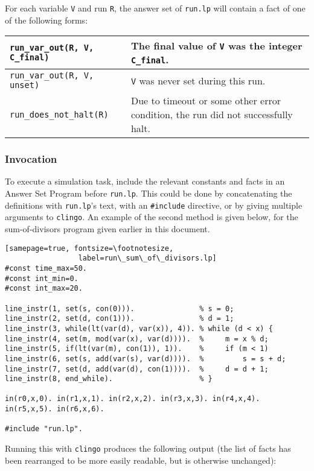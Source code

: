 \documentclass[a4paper,twoside,notitlepage,12pt]{article}
\begin{document}
For each variable \verb|V| and run \verb|R|, the answer set of \verb|run.lp| will 
contain a fact of one of the following forms:

\begin{tabularx}{\textwidth}{|l|X|}
\hline
\verb|run_var_out(R, V, C_final)| &
The final value of \verb|V| was the integer \verb|C_final|. \\*
\hline
\verb|run_var_out(R, V, unset)| &
\verb|V| was never set during this run. \\*
\hline
\verb|run_does_not_halt(R)| &
Due to timeout or some other error condition, the run did not successfully halt. \\*
\hline
\end{tabularx}

\subsubsection{Invocation} \label{sec:sim:inv}

To execute a simulation task, include the relevant constants and facts in an Answer Set 
Program before \verb|run.lp|. This could be done by concatenating the definitions with 
\verb|run.lp|'s text, with an \verb|#include| directive, or by giving multiple 
arguments to \verb|clingo|. An example of the second method is given below, for the 
sum-of-divisors program given earlier in this document.

\clearpage
\begin{verbatim}[samepage=true, fontsize=\footnotesize,
                 label=run\_sum\_of\_divisors.lp]
#const time_max=50.
#const int_min=0.
#const int_max=20.

line_instr(1, set(s, con(0))).               % s = 0;
line_instr(2, set(d, con(1))).               % d = 1;
line_instr(3, while(lt(var(d), var(x)), 4)). % while (d < x) {
line_instr(4, set(m, mod(var(x), var(d)))).  %     m = x % d;
line_instr(5, if(lt(var(m), con(1)), 1)).    %     if (m < 1)
line_instr(6, set(s, add(var(s), var(d)))).  %         s = s + d;
line_instr(7, set(d, add(var(d), con(1)))).  %     d = d + 1;
line_instr(8, end_while).                    % }

in(r0,x,0). in(r1,x,1). in(r2,x,2). in(r3,x,3). in(r4,x,4). in(r5,x,5). in(r6,x,6).

#include "run.lp".
\end{verbatim}

Running this with \verb|clingo| produces the following output (the list of facts has 
been rearranged to be more easily readable, but is otherwise unchanged):
\end{document}
